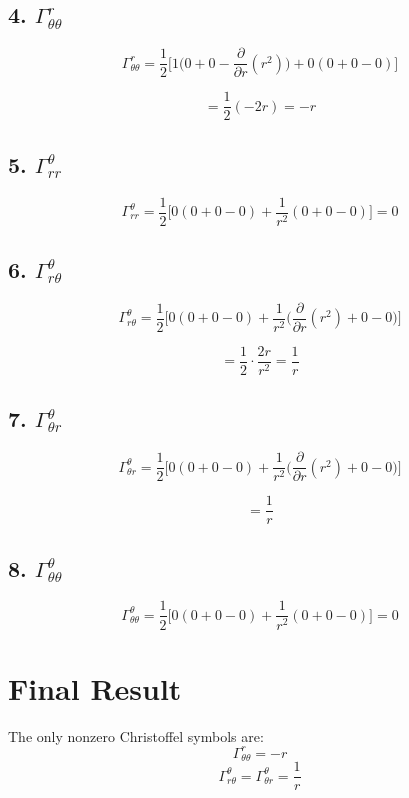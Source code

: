 \documentclass{article}
\begin{document}
	\subsection*{4. $\Gamma^r_{\theta\theta}$}
	
	\[
	\Gamma^r_{\theta\theta}
	=
	\frac{1}{2}\Big[
	1\Big(0+0-\frac{\partial}{\partial r}(r^2)\Big)
	+0(0+0-0)
	\Big]
	\]
	
	\[
	=
	\frac{1}{2}(-2r) = -r
	\]
	
	\subsection*{5. $\Gamma^\theta_{rr}$}
	
	\[
	\Gamma^\theta_{rr}
	=
	\frac{1}{2}\Big[
	0(0+0-0) + \frac{1}{r^2}(0+0-0)
	\Big]
	=0
	\]
	
	\subsection*{6. $\Gamma^\theta_{r\theta}$}
	
	\[
	\Gamma^\theta_{r\theta}
	=
	\frac{1}{2}\Big[
	0(0+0-0) +
	\frac{1}{r^2}\Big(\frac{\partial}{\partial r}(r^2)+0-0\Big)
	\Big]
	\]
	
	\[
	=
	\frac{1}{2}\cdot \frac{2r}{r^2}
	= \frac{1}{r}
	\]
	
	\subsection*{7. $\Gamma^\theta_{\theta r}$}
	
	\[
	\Gamma^\theta_{\theta r}
	=
	\frac{1}{2}\Big[
	0(0+0-0) +
	\frac{1}{r^2}\Big(\frac{\partial}{\partial r}(r^2)+0-0\Big)
	\Big]
	\]
	
	\[
	=
	\frac{1}{r}
	\]
	
	\subsection*{8. $\Gamma^\theta_{\theta\theta}$}
	
	\[
	\Gamma^\theta_{\theta\theta}
	=
	\frac{1}{2}\Big[
	0(0+0-0) +
	\frac{1}{r^2}(0+0-0)
	\Big]
	=0
	\]
	
	\section*{Final Result}
	
	The only nonzero Christoffel symbols are:
	\[
	\Gamma^r_{\theta\theta} = -r
	\]
	\[
	\Gamma^\theta_{r\theta} = \Gamma^\theta_{\theta r} = \frac{1}{r}
	\]
	
\end{document}
